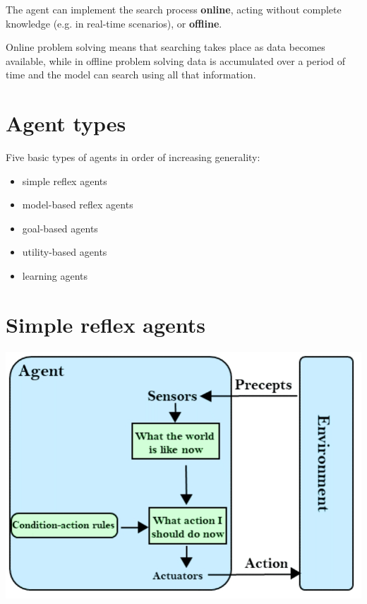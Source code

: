 \documentclass{article}
\begin{document}
The agent can implement the search process \textbf{online}, acting without complete knowledge (e.g. in real-time scenarios), or \textbf{offline}.

Online problem solving means that searching takes place as data becomes available, while in offline problem solving data is accumulated over a period of time and the model can search using all that information. 

\section{Agent types}

Five basic types of agents in order of increasing generality:

\begin{center}
    \begin{itemize}
        \item simple reflex agents
        \item model-based reflex agents
        \item goal-based agents
        \item utility-based agents
        \item learning agents
    \end{itemize}
\end{center}

\newpage

\section{Simple reflex agents}

\begin{center}
    \includegraphics[scale=0.4]{images/simple_relfex_agent.jpg}
\end{center}
\end{document}
